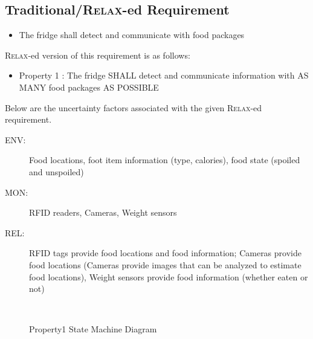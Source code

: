 \documentclass[a4paper,twoside]{article}
\def\myrelax{\textsc{Relax}}                  %
\begin{document}
\subsection{Traditional/\myrelax{}-ed Requirement}

\begin{itemize}
\item The fridge shall detect and communicate with food packages
\end{itemize}

\myrelax{}-ed version of this requirement is as follows:

\begin{itemize}
\item Property 1 : The fridge SHALL detect and communicate information with AS MANY food packages AS POSSIBLE
\end{itemize}

Below are the uncertainty factors associated with the given \myrelax{}-ed requirement.

\begin{description}
\item[ENV:] Food locations, foot item information (type, calories), food state (spoiled and unspoiled)
\item[MON:] RFID readers, Cameras, Weight sensors
\item[REL:] RFID tags provide food locations and food information; Cameras provide food locations (Cameras provide images that can be analyzed to estimate food locations), Weight sensors provide food information (whether eaten or not)
\end{description}

\begin{figure}[!h]
  \vspace{8cm}~
  \centering
  {}
  \caption{Property1 State Machine Diagram}
  \label{fig:property1stm}
 \end{figure}
 
\end{document}
